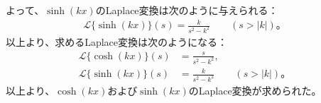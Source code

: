 \documentclass[platex,dvipdfmx,a4paper]{jsarticle}
\begin{document}
  よって、$\sinh(kx)$のLaplace変換は次のように与えられる：
  \begin{align*}
    \mathcal{L}\{\sinh(kx)\}(s)
    =\frac{k}{s^2-k^2}
    \qquad(s>|k|)。
  \end{align*}
  以上より、求めるLaplace変換は次のようになる：
  \begin{align*}
    \mathcal{L}\{\cosh(kx)\}(s)
    &=\frac{s}{s^2-k^2},\\
    \mathcal{L}\{\sinh(kx)\}(s)
    &=\frac{k}{s^2-k^2}
    \qquad(s>|k|)。
  \end{align*}
  以上より、$\cosh(kx)$および$\sinh(kx)$のLaplace変換が求められた。
\end{document}
